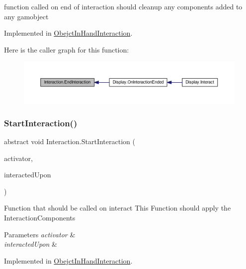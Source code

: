 function called on end of interaction should cleanup any components added to any gamobject 



Implemented in \mbox{\hyperlink{class_obejct_in_hand_interaction_a67633fc3c21606d209e8e54db5c516a9}{Obejct\+In\+Hand\+Interaction}}.

Here is the caller graph for this function\+:
\nopagebreak
\begin{figure}[H]
\begin{center}
\leavevmode
\includegraphics[width=350pt]{class_interaction_a13c7d99dbecf8e0d61973fd23de6400c_icgraph}
\end{center}
\end{figure}
\mbox{\label{class_interaction_afa5031e1db8f7c23cf26c896937e69f9}} 
\subsubsection{\texorpdfstring{Start\+Interaction()}{StartInteraction()}}
{\footnotesize\ttfamily abstract void Interaction.\+Start\+Interaction (\begin{DoxyParamCaption}\item[{Game\+Object}]{activator,  }\item[{Game\+Object}]{interacted\+Upon }\end{DoxyParamCaption})\hspace{0.3cm}{\ttfamily [pure virtual]}}



Function that should be called on interact This Function should apply the Interaction\+Components 


\begin{DoxyParams}{Parameters}
{\em activator} & \\
\hline
{\em interacted\+Upon} & \\
\hline
\end{DoxyParams}


Implemented in \mbox{\hyperlink{class_obejct_in_hand_interaction_a9046df053628946f7ce5f4e484097482}{Obejct\+In\+Hand\+Interaction}}.

